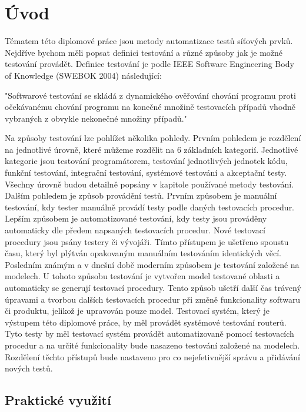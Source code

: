 \chapter{Úvod}
Tématem této diplomové práce jsou metody automatizace testů síťových prvků. Nejdříve bychom měli popsat definici testování a různé způsoby jak je možné testování provádět. Definice testování je podle IEEE Software Engineering Body of Knowledge (SWEBOK 2004) následující:

"Softwarové testování se skládá z dynamického ověřování chování programu proti očekávanému chování programu na konečné množině testovacích případů vhodně vybraných z obvykle nekonečné množiny případů."

Na způsoby testování lze pohlížet několika pohledy. Prvním pohledem je rozdělení na jednotlivé úrovně, které můžeme rozdělit na 6 základních kategorií. Jednotlivé kategorie jsou testování programátorem, testování jednotlivých jednotek kódu, funkční testování, integrační testování, systémové testování a akceptační testy. Všechny úrovně budou detailně popsány v kapitole používané metody testování. Dalším pohledem je způsob provádění testů. Prvním způsobem je manuální testování, kdy tester manuálně provádí testy podle daných testovacích procedur. Lepším způsobem je automatizované testování, kdy testy jsou prováděny automaticky dle předem napsaných testovacích procedur. Nové testovací procedury jsou psány testery či vývojáři. Tímto přístupem je ušetřeno spoustu času, který byl plýtván opakovaným manuálním testováním identických věcí. Posledním známým a v dnešní době moderním způsobem je testování založené na modelech. U tohoto způsobu testování je vytvořen model testované oblasti a automaticky se generují testovací procedury. Tento způsob ušetří další čas trávený úpravami a tvorbou dalších testovacích procedur při změně funkcionality softwaru či produktu, jelikož je upravován pouze model. Testovací systém, který je výstupem této diplomové práce, by měl provádět systémové testování routerů. Tyto testy by měl testovací systém provádět automatizovaně pomocí testovacích procedur a na určité funkcionality bude nasazeno testování založené na modelech. Rozdělení těchto přístupů bude nastaveno pro co nejefetivnější správu a přidávání nových testů.

\section{Praktické využití}

